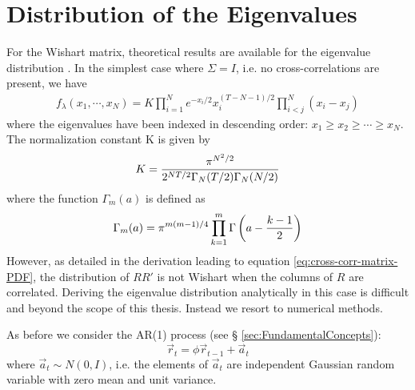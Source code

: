 \section{Distribution of the Eigenvalues}\label{sec:GCC-numerical}
For the Wishart matrix, theoretical results are available for the
eigenvalue distribution \cite{Chiani2012}. In the simplest case where
$\Sigma = I$, i.e. no cross-correlations are present, we have
\begin{eqnarray*}
  f_{\lambda}(x_1, \cdots, x_N) = K \prod_{i=1}^N e^{-x_i/2}
  x_i^{(T-N-1)/2} \prod_{i<j}^N (x_i - x_j)
\end{eqnarray*}
where the eigenvalues have been indexed in descending order: $x_1 \geq
x_2 \geq \cdots \geq x_N$. The normalization constant K is given by
\begin{equation*}
  K = {\pi^{N^2/2} \over 2^{NT/2}\Gamma_N(T/2) \Gamma_N(N/2)}
\end{equation*}
where the function $\Gamma_m(a)$ is defined as
\begin{equation*}
  \Gamma_m(a) = \pi^{m(m-1)/4} \prod_{k=1}^m \Gamma\left(a - {k-1
      \over 2}\right)
\end{equation*}
However, as detailed in the derivation leading to equation
\ref{eq:cross-corr-matrix-PDF}, the distribution of $RR'$ is not
Wishart when the columns of $R$ are correlated. Deriving the
eigenvalue distribution analytically in this case is difficult and
beyond the scope of this thesis. Instead we resort to numerical
methods.

As before we consider the AR(1) process (see \S
\ref{sec:FundamentalConcepts}):
\begin{equation*}
  \vec{r}_t = \phi \vec{r}_{t-1} + \vec{a}_{t}
\end{equation*}
where $\vec{a}_t \sim N(0, I)$, i.e. the elements of $\vec{a}_t$ are
independent Gaussian random variable with zero mean and unit
variance.

